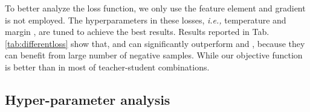 \documentclass[final]{cvpr}
\begin{document}
To better analyze the loss function, we only use the feature element and gradient is not employed. The hyperparameters in these losses, \emph{i.e.,}  temperature  and margin , are tuned to achieve the best results.
Results reported in Tab. \ref{tab:differentloss} show that,  and  can significantly outperform   and , because they can benefit from large number of negative samples. While our objective function  is better than  in most of teacher-student combinations.














\subsection{Hyper-parameter analysis}
\end{document}
